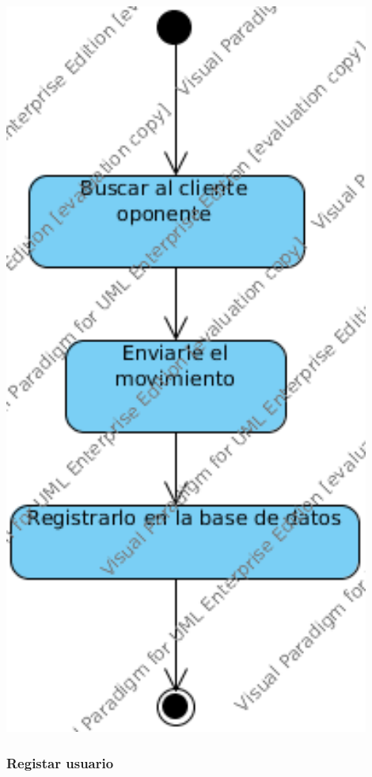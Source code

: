 \documentclass[a4paper,11pt,oneside]{article}
\begin{document}
\includegraphics[width=0.9\textwidth]{img/ms_PonerFichaServidor.png}\\[1cm]

\subsubsection{Registar usuario}
\end{document}
